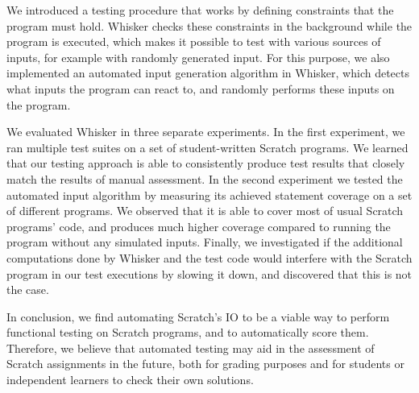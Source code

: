 We introduced a testing procedure that works by defining constraints that the program must hold.
Whisker checks these constraints in the background while the program is executed,
which makes it possible to test with various sources of inputs, for example with randomly generated input.
For this purpose, we also implemented an automated input generation algorithm in Whisker,
which detects what inputs the program can react to, and randomly performs these inputs on the program.
\parspace

We evaluated Whisker in three separate experiments.
In the first experiment, we ran multiple test suites on a set of student-written Scratch programs.
We learned that our testing approach is able to consistently produce test results that closely match the results of manual assessment.
In the second experiment we tested the automated input algorithm by measuring its achieved statement coverage
on a set of different programs.
We observed that it is able to cover most of usual Scratch programs' code,
and produces much higher coverage compared to running the program without any simulated inputs.
Finally, we investigated if the additional computations done by Whisker and the test code would interfere with the Scratch program
in our test executions by slowing it down, and discovered that this is not the case.
\parspace


In conclusion, we find automating Scratch's IO to be a viable way to perform functional testing on Scratch programs,
and to automatically score them.
Therefore, we believe that automated testing may aid in the assessment of Scratch assignments in the future,
both for grading purposes and for students or independent learners to check their own solutions.
